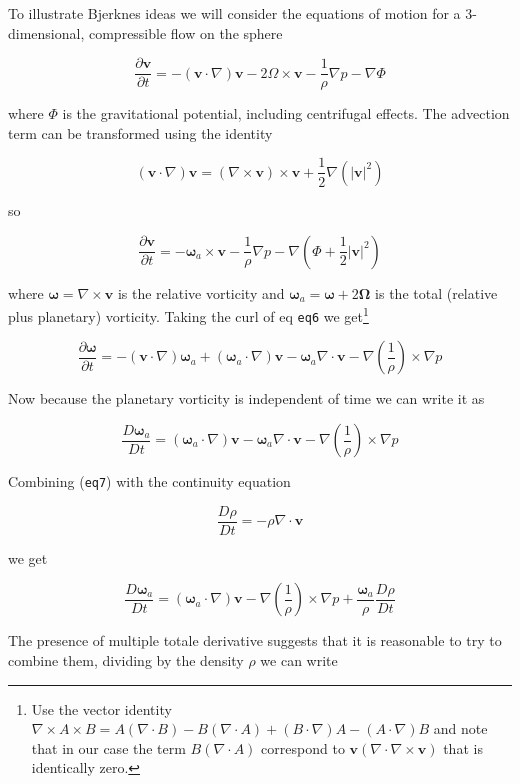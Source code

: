 To illustrate Bjerknes ideas we will consider the equations of motion
for a 3-dimensional, compressible flow on the sphere

\[\frac{\partial \mathbf{v}}{\partial t} = - (\mathbf{v}\cdot \nabla)\mathbf{v} - 2\Omega \times \mathbf{v} -\frac{1}{\rho}\nabla p - \nabla\Phi\]

where \(\Phi\) is the gravitational potential, including centrifugal
effects. The advection term can be transformed using the identity

\[(\mathbf{v}\cdot \nabla)\mathbf{v} = (\nabla \times \mathbf{v})\times\mathbf{v} + \frac{1}{2}\nabla\left( |\mathbf{v}|^2\right)\]

so

\[
\frac{\partial \mathbf{v}}{\partial t} = -\mathbf{\omega}_a\times\mathbf{v} -\frac{1}{\rho}\nabla p -\nabla \left( \Phi +\frac{1}{2}|\mathbf{v}|^2\right)
\]

where \(\mathbf{\omega} = \nabla\times\mathbf{v}\) is the relative
vorticity and \(\mathbf{\omega}_a = \mathbf{\omega} + 2\mathbf{\Omega}\)
is the total (relative plus planetary) vorticity. Taking the curl of eq
\texttt{eq6} we get\footnote{Use the vector identity
  \(\nabla \times A\times B = A(\nabla\cdot B) -B(\nabla\cdot A) + (B\cdot\nabla)A-(A\cdot\nabla)B\)
  and note that in our case the term \(B(\nabla\cdot A)\) correspond to
  \(\mathbf{v}(\nabla\cdot \nabla\times \mathbf{v})\) that is
  identically zero.}

\[\frac{\partial \mathbf{\omega}}{\partial t} = -(\mathbf{v}\cdot\nabla)\mathbf{\omega}_a +(\mathbf{\omega}_a\cdot\nabla) \mathbf{v} -\mathbf{\omega}_a \nabla\cdot\mathbf{v} -\nabla\left(\frac{1}{\rho}\right)\times\nabla p\]

Now because the planetary vorticity is independent of time we can write
it as

\[\frac{D \mathbf{\omega}_a}{Dt} = (\mathbf{\omega}_a\cdot\nabla) \mathbf{v} -\mathbf{\omega}_a \nabla\cdot\mathbf{v} -\nabla\left(\frac{1}{\rho}\right)\times\nabla p\]

Combining (\texttt{eq7}) with the continuity equation

\[\frac{D \rho}{Dt} = -\rho\nabla\cdot\mathbf{v}\]

we get

\[\frac{D \mathbf{\omega}_a}{Dt} = (\mathbf{\omega}_a\cdot\nabla) \mathbf{v}  -\nabla\left(\frac{1}{\rho}\right)\times\nabla p +\frac{\mathbf{\omega}_a}{\rho}\frac{D \rho}{Dt}\]

The presence of multiple totale derivative suggests that it is
reasonable to try to combine them, dividing by the density \(\rho\) we
can write

